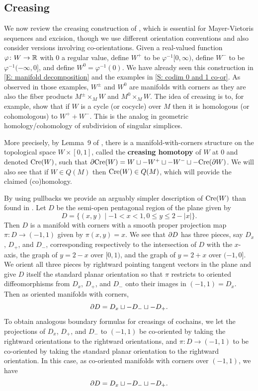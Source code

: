 


\subsection{Creasing}\label{S: creasing}

We now review the creasing construction of \cite[Section 2.4]{Lipy14}, which is essential for Mayer-Vietoris sequences and excision, though we use different orientation conventions and also consider versions involving co-orientations.
Given a real-valued function $\varphi \colon W \to \mathbb{R}$ with $0$ a regular value,
define $W^+$ to be $\varphi^{-1} [0, \infty)$, define $W^-$ to be $\varphi^{-1} (-\infty, 0]$, and define $W^0 = \varphi^{-1}(0)$. We have already seen this construction in \cref{E: manifold decomposition} and the examples in \cref{S: codim 0 and 1 co-or}.
 As observed in those examples, $W^\pm$ and $W^0$
are manifolds with corners as they are also the fiber products $M^\pm \times_M W$ and $M^0 \times_M W$. The idea of creasing is to, for example, show that if $W$ is a cycle (or cocycle) over $M$ then it is homologous (or cohomologous) to $W^++W^-$. This is the analog in geometric homology/cohomology of subdivision of singular simplices.


More precisely, by Lemma~9 of \cite{Lipy14}, there is a manifold-with-corners structure on the topological space $W \times [0,1]$,
called the \textbf{creasing homotopy} of $W$ at $0$ and denoted $\mathrm{Cre}(W)$, such that $\partial \mathrm{Cre}(W) = W \sqcup -W^+ \sqcup -W^- \sqcup - \mathrm{Cre}(\partial W)$. We will also see that if $W \in Q(M)$ then $\mathrm{Cre}(W) \in Q(M)$, which will provide the claimed (co)homology.



By using pullbacks we provide an arguably simpler description of $\mathrm{Cre}(W)$ than found in \cite{Lipy14}. Let $D$ be the semi-open pentagonal region of the plane given by $$D = \{(x,y) \mid -1<x<1, 0\leq y\leq 2-|x|\}.$$
Then $D$ is a manifold with corners with a smooth proper projection map $\pi:D \to (-1,1)$ given by $\pi(x,y) = x$. We see that $\partial D$ has three pieces, say $D_x$, $D_+$, and $D_-$, corresponding respectively to the intersection of $D$ with the $x$-axis, the graph of $y = 2-x$ over $[0,1)$, and the graph of $y = 2+x$ over $(-1, 0]$. We orient all three pieces by rightward pointing tangent vectors in the plane and give $D$ itself the standard planar orientation so that $\pi$ restricts to oriented diffeomorphisms from $D_x$, $D_+$, and $D_-$ onto their images in $(-1,1) = D_x$. Then as oriented manifolds with corners, $$\partial D = D_x \sqcup -D_- \sqcup -D_+.$$
To obtain analogous boundary formulas for creasings of cochains, we let the projections of $D_x$, $D_+$, and $D_-$ to $(-1,1)$ be co-oriented by taking the rightward orientations to the rightward orientations, and $\pi:D \to (-1,1)$ to be co-oriented by taking the standard planar orientation to the rightward orientation. In this case, as co-oriented manifolds with corners over $(-1,1)$, we have
 $$\partial D = D_x \sqcup -D_- \sqcup -D_+.$$

